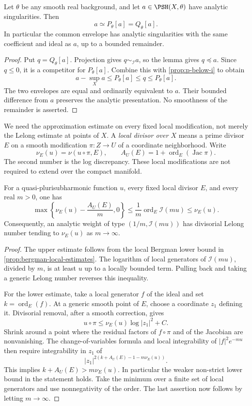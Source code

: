 \begin{proposition}\label{prop:analytic-envelope-type}
Let $\theta$ be any smooth real background, and let $a\in\PSH(X,\theta)$ have analytic singularities. Then
\[
 a\simeq P_\theta[a]=Q_\theta[a].
\]
In particular the common envelope has analytic singularities with the same coefficient and ideal as $a$, up to a bounded remainder.
\end{proposition}
\begin{proof}
Put $q=Q_\theta[a]$. Projection gives $q\sim_{\mathcal I}a$, so the lemma gives $q\preceq a$. Since $q\leq0$, it is a competitor for $P_\theta[a]$. Combine this with \cref{prop:p-below-i} to obtain
\[
 a-\sup_Xa\leq P_\theta[a]\leq q\leq P_\theta[a].
\]
The two envelopes are equal and ordinarily equivalent to $a$. Their bounded difference from $a$ preserves the analytic presentation. No smoothness of the remainder is asserted.
\end{proof}

We need the approximation estimate on every fixed local modification, not merely the Lelong estimate at points of $X$. A \emph{local divisor over $X$} means a prime divisor $E$ on a smooth modification $\pi:Z\to U$ of a coordinate neighborhood. Write
\[
 \nu_E(u)=\nu(u\circ\pi,E),\qquad
 A_U(E)=1+\operatorname{ord}_E(\operatorname{Jac}\pi).
\]
The second number is the log discrepancy. These local modifications are not required to extend over the compact manifold.

\begin{lemma}\label{lem:bergman-divisorial-error}
For a quasi-plurisubharmonic function $u$, every fixed local divisor $E$, and every real $m>0$, one has
\[
 \max\!\left\{\nu_E(u)-\frac{A_U(E)}m,0\right\}
 \leq \frac1m\operatorname{ord}_E\mathcal I(mu)
 \leq \nu_E(u).
\]
Consequently, an analytic weight of type $(1/m,\mathcal I(mu))$ has divisorial Lelong number tending to $\nu_E(u)$ as $m\to\infty$.
\end{lemma}
\begin{proof}
The upper estimate follows from the local Bergman lower bound in \cref{prop:bergman-local-estimates}. The logarithm of local generators of $\mathcal I(mu)$, divided by $m$, is at least $u$ up to a locally bounded term. Pulling back and taking a generic Lelong number reverses this inequality.

For the lower estimate, take a local generator $f$ of the ideal and set $k=\operatorname{ord}_E(f)$. At a generic smooth point of $E$, choose a coordinate $z_1$ defining it. Divisorial removal, after a smooth correction, gives
\[
 u\circ\pi\leq\nu_E(u)\log|z_1|^2+C.
\]
Shrink around a point where the residual factors of $f\circ\pi$ and of the Jacobian are nonvanishing. The change-of-variables formula and local integrability of $|f|^2e^{-mu}$ then require integrability in $z_1$ of
\[
 |z_1|^{2(k+A_U(E)-1-m\nu_E(u))}.
\]
This implies $k+A_U(E)>m\nu_E(u)$. In particular the weaker non-strict lower bound in the statement holds. Take the minimum over a finite set of local generators and use nonnegativity of the order. The last assertion now follows by letting $m\to\infty$.
\end{proof}

